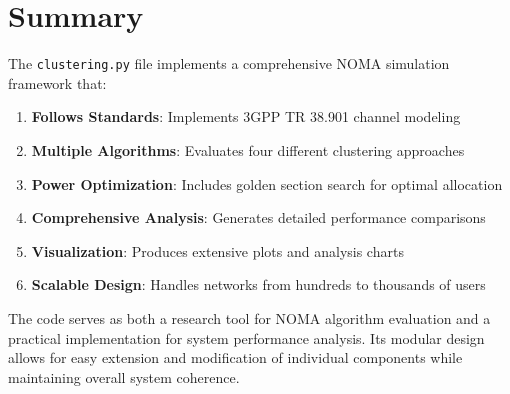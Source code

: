 \documentclass[11pt,a4paper]{article}
\begin{document}
\section{Summary}

The \texttt{clustering.py} file implements a comprehensive NOMA simulation framework that:

\begin{enumerate}
    \item \textbf{Follows Standards}: Implements 3GPP TR 38.901 channel modeling
    \item \textbf{Multiple Algorithms}: Evaluates four different clustering approaches
    \item \textbf{Power Optimization}: Includes golden section search for optimal allocation
    \item \textbf{Comprehensive Analysis}: Generates detailed performance comparisons
    \item \textbf{Visualization}: Produces extensive plots and analysis charts
    \item \textbf{Scalable Design}: Handles networks from hundreds to thousands of users
\end{enumerate}

The code serves as both a research tool for NOMA algorithm evaluation and a practical implementation for system performance analysis. Its modular design allows for easy extension and modification of individual components while maintaining overall system coherence.
\end{document}
